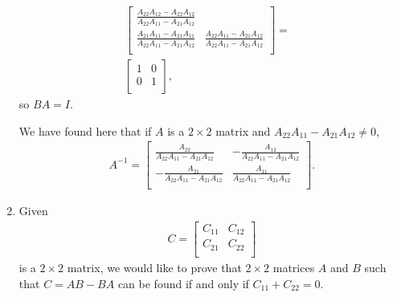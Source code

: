 \documentclass[12pt]{article}
\begin{document}
\begin{enumerate}
\begin{align*}
\begin{bmatrix}
          \frac{A_{22}A_{12} - A_{22}A_{12}}
               {A_{22}A_{11} - A_{21}A_{12}}\\
        \frac{A_{21}A_{11} - A_{21}A_{11}}
             {A_{22}A_{11} - A_{21}A_{12}} &
          \frac{A_{22}A_{11} - A_{21}A_{12}}
               {A_{22}A_{11} - A_{21}A_{12}}\\
      \end{bmatrix}
      =&\\
      \begin{bmatrix}
        1 & 0\\
        0 & 1\\
      \end{bmatrix},
    \end{align*}
    so $BA = I$.

    \begin{comm}
      We have found here that if $A$ is a $2 \times 2$ matrix and
      $A_{22}A_{11} - A_{21}A_{12} \neq 0$,
      \begin{align*}
        A^{-1} =
        \begin{bmatrix}
          \frac{A_{22}}{A_{22}A_{11} - A_{21}A_{12}} &
            -\frac{A_{12}}{A_{22}A_{11} - A_{21}A_{12}}\\
          -\frac{A_{21}}{A_{22}A_{11} - A_{21}A_{12}} &
            \frac{A_{11}}{A_{22}A_{11} - A_{21}A_{12}}\\
        \end{bmatrix}.
      \end{align*}
    \end{comm}

  \item
    Given
    \begin{align*}
      C =
      \begin{bmatrix}
        C_{11} & C_{12}\\
        C_{21} & C_{22}\\
      \end{bmatrix}
    \end{align*}
    is a $2 \times 2$ matrix, we would like to prove that $2
    \times 2$ matrices $A$ and $B$ such that $C = AB - BA$ can
    be found if and only if $C_{11} + C_{22} = 0$.


\end{enumerate}
\end{document}
